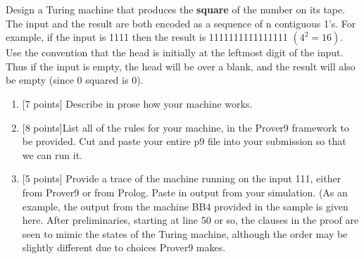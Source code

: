 \documentclass[12pt,hidelinks,letterpaper,boxed,cm]{hmcpset}
\newcommand{\tb}[1]{\textbf{#1}}
\begin{document}
\begin{solution}
    \vfill
\end{solution}
\newpage

\begin{problem}[12.]
    [20 points] Design a Turing machine that produces the \tb{square} of the number on its tape. The input and the result are both encoded as a sequence of n contiguous 1’s. For example, if the input is 1111 then the result is 1111111111111111 $(4^2 = 16)$. Use the convention that the head is initially at the leftmost digit of the input. Thus if the input is empty, the head will be over a blank, and the result will also be empty (since 0 squared is 0).
    \begin{enumerate}[label=\alph*.]
        \item {[7 points]} Describe in prose how your machine works. 
        \item {[8 points]}List all of the rules for your machine, in the Prover9 framework to be provided. Cut and paste your entire p9 file into your submission so that we can run it.
        \item {[5 points]} Provide a trace of the machine running on the input 111, either from Prover9 or from Prolog. Paste in output from your simulation. (As an example, the output from the machine BB4 provided in the sample is given here. After preliminaries, starting at line 50 or so, the clauses in the proof are seen to mimic the states of the Turing machine, although the order may be slightly different due to choices Prover9 makes.
    \end{enumerate}
\end{problem}

\begin{solution}
    \vfill
\end{solution}
\newpage
\end{document}
